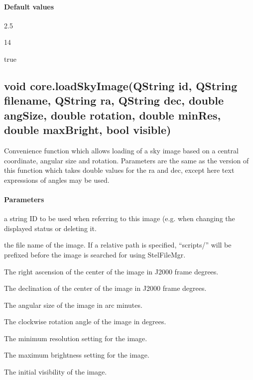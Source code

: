 \paragraph{Default values}
\begin{description}[align=right,labelwidth=3cm,leftmargin=3.2cm]
\item[\parameter{minRes}] 2.5
\item[\parameter{maxBright}] 14
\item[\parameter{visible}] true
\end{description}

\subsection{void core.loadSkyImage(QString id, QString filename, QString ra, QString dec, double angSize, double rotation, double minRes, double maxBright, bool visible)}
\label{sec:ScriptingAPI:core:loadSkyImageStr1}
Convenience function which allows loading of a sky image based on a central coordinate, angular size and rotation. Parameters are the same as the version of this function which takes double values for the ra and dec, except here text expressions of angles may be used.

\paragraph{Parameters}
\begin{description}[align=right,labelwidth=3cm,leftmargin=3.2cm]
\item[\parameter{id}] a string ID to be used when referring to this image (e.g. when changing the displayed status or deleting it.
\item[\parameter{filename}] the file name of the image. If a relative path is specified, ``scripts/'' will be prefixed before the image is searched for using StelFileMgr.
\item[\parameter{ra}] The right ascension of the center of the image in J2000 frame degrees.
\item[\parameter{dec}] The declination of the center of the image in J2000 frame degrees.
\item[\parameter{angSize}] The angular size of the image in arc minutes.
\item[\parameter{rotation}] 	The clockwise rotation angle of the image in degrees.
\item[\parameter{minRes}] The minimum resolution setting for the image.
\item[\parameter{maxBright}] The maximum brightness setting for the image.
\item[\parameter{visible}] The initial visibility of the image.
\end{description}

